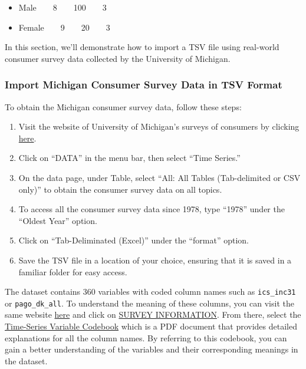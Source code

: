 \documentclass[
]{book}
\providecommand{\tightlist}{%
  \setlength{\itemsep}{0pt}\setlength{\parskip}{0pt}}
\begin{document}
\begin{itemize}
\tightlist
\item
  Male~~~~8~~~~100~~~~3
\item
  Female~~~~9~~~~20~~~~3
\end{itemize}

In this section, we'll demonstrate how to import a TSV file using real-world consumer survey data collected by the University of Michigan.

\hypertarget{import-michigan-consumer-survey-data-in-tsv-format}{%
\subsubsection*{Import Michigan Consumer Survey Data in TSV Format}\label{import-michigan-consumer-survey-data-in-tsv-format}}

To obtain the Michigan consumer survey data, follow these steps:

\begin{enumerate}
\def\labelenumi{\arabic{enumi}.}
\tightlist
\item
  Visit the website of University of Michigan's surveys of consumers by clicking \href{https://data.sca.isr.umich.edu/}{here}.
\item
  Click on ``DATA'' in the menu bar, then select ``Time Series.''
\item
  On the data page, under Table, select ``All: All Tables (Tab-delimited or CSV only)'' to obtain the consumer survey data on all topics.
\item
  To access all the consumer survey data since 1978, type ``1978'' under the ``Oldest Year'' option.
\item
  Click on ``Tab-Deliminated (Excel)'' under the ``format'' option.
\item
  Save the TSV file in a location of your choice, ensuring that it is saved in a familiar folder for easy access.
\end{enumerate}

The dataset contains 360 variables with coded column names such as \texttt{ics\_inc31} or \texttt{pago\_dk\_all}. To understand the meaning of these columns, you can visit the same website \href{https://data.sca.isr.umich.edu/}{here} and click on \href{https://data.sca.isr.umich.edu/survey-info.php\#}{SURVEY INFORMATION}. From there, select the \href{https://data.sca.isr.umich.edu/fetchdoc.php?docid=45121}{Time-Series Variable Codebook} which is a PDF document that provides detailed explanations for all the column names. By referring to this codebook, you can gain a better understanding of the variables and their corresponding meanings in the dataset.
\end{document}

